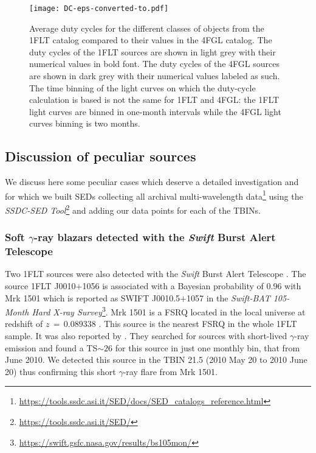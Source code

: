 \documentclass{aastex62}
\begin{document}
\begin{figure}
 \centering
 \texttt{[image: DC-eps-converted-to.pdf]}
 \caption{Average duty cycles for the different classes of objects from the 1FLT catalog compared to their values in the 4FGL catalog. The duty cycles of the 1FLT sources are shown in light grey with their numerical values in bold font. The duty cycles of the 4FGL sources are shown in dark grey with their numerical values labeled as such. The time binning of the light curves on which the duty-cycle calculation is based is not the same for 1FLT and 4FGL: the 1FLT light curves are binned in one-month intervals while the 4FGL light curves binning is two months.}
\end{figure}\label{figure:dc}

\subsection{Discussion of peculiar sources}
We discuss here some peculiar cases which deserve a detailed investigation and for which we built SEDs collecting all archival multi-wavelength data\footnote{\url{https://tools.ssdc.asi.it/SED/docs/SED_catalogs_reference.html}\label{fn:arc}} using the \textit{SSDC-SED Tool}\footnote{\url{https://tools.ssdc.asi.it/SED/}} and adding our data points for each of the TBINs.

\subsubsection{Soft $\gamma$-ray blazars detected with the {\it Swift} Burst Alert Telescope}
Two 1FLT sources were also detected with the {\it Swift} Burst Alert Telescope \citep{krimm2013swift}.
%
The source 1FLT J0010$+$1056 is associated with a Bayesian probability of 0.96 with Mrk 1501 which is reported as SWIFT J0010.5$+$1057 in the \textit{Swift-BAT 105-Month Hard X-ray Survey}\footnote{\url{https://swift.gsfc.nasa.gov/results/bs105mon/}}. Mrk 1501 is a FSRQ located in the local universe at redshift of $z\,=\,0.089338$ \citep{sargent1970isolated}. This source is the nearest FSRQ in the whole 1FLT sample. It was also reported by \citet{arsioli2018complete}. They searched for sources with short-lived $\gamma$-ray emission and found a TS$\sim26$ for this source in just one monthly bin, that from June 2010. We detected this source in the TBIN 21.5 (2010 May 20 to 2010 June 20) thus confirming this short $\gamma$-ray flare from Mrk 1501.
\end{document}
